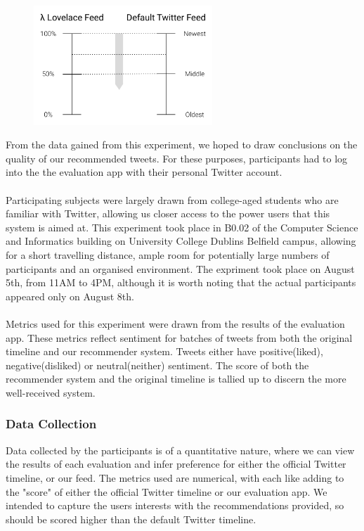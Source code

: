 \documentclass{article}
\begin{document}
\begin{figure}[H]
    \includegraphics[width=0.6\textwidth, center]{evaluations_1}
\end{figure}

From the data gained from this experiment, we hoped to draw conclusions on the quality of our recommended tweets. For these purposes, participants had to log into the the evaluation app with their personal Twitter account.
\\\\
Participating subjects were largely drawn from college-aged students who are familiar with Twitter, allowing us closer access to the power users that this system is aimed at. This experiment took place in B0.02 of the Computer Science and Informatics building on University College Dublins Belfield campus, allowing for a short travelling distance, ample room for potentially large numbers of participants and an organised environment. The expriment took place on August 5th, from 11AM to 4PM, although it is worth noting that the actual participants appeared only on August 8th.
\\\\
Metrics used for this experiment were drawn from the results of the evaluation app. These metrics reflect sentiment for batches of tweets from both the original timeline and our recommender system. Tweets either have positive(liked), negative(disliked) or neutral(neither) sentiment. The score of both the recommender system and the original timeline is tallied up to discern the more well-received system.

\subsubsection*{Data Collection} 









Data collected by the participants is of a quantitative nature, where we can view the results of each evaluation and infer preference for either the official Twitter timeline, or our feed. The metrics used are numerical, with each like adding to the "score" of either the official Twitter timeline or our evaluation app. We intended to capture the users interests with the recommendations provided, so should be scored higher than the default Twitter timeline.
\\\\
\end{document}
